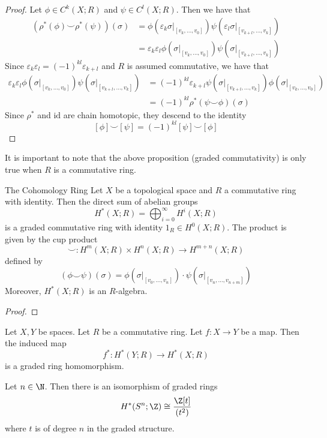 \documentclass[a4paper]{article}
\begin{document}
\begin{prp}{}{}
\begin{proof}
Let $\phi\in C^k(X;R)$ and $\psi\in C^l(X;R)$. Then we have that 
\begin{align*}
\left(\rho^\ast(\phi)\smile\rho^\ast(\psi)\right)(\sigma)&=\phi(\varepsilon_k\sigma|_{[v_k,\dots,v_0]})\psi(\varepsilon_l\sigma|_{[v_{k+l},\dots,v_k]})\\
&=\varepsilon_k\varepsilon_l\phi(\sigma|_{[v_k,\dots,v_0]})\psi(\sigma|_{[v_{k+l},\dots,v_k]})
\end{align*}
Since $\varepsilon_k\varepsilon_l=(-1)^{kl}\varepsilon_{k+l}$ and $R$ is assumed commutative, we have that
\begin{align*}
\varepsilon_k\varepsilon_l\phi(\sigma|_{[v_k,\dots,v_0]})\psi(\sigma|_{[v_{k+l},\dots,v_k]})&=(-1)^{kl}\varepsilon_{k+l}\psi(\sigma|_{[v_{k+l},\dots,v_k]})\phi(\sigma|_{[v_k,\dots,v_0]})\\
&=(-1)^{kl}\rho^\ast(\psi\smile\phi)(\sigma)
\end{align*}
Since $\rho^\ast$ and $\text{id}$ are chain homotopic, they descend to the identity $$[\phi]\smile[\psi]=(-1)^{kl}[\psi]\smile[\phi]$$
\end{proof}
\end{prp}

It is important to note that the above proposition (graded commutativity) is only true when $R$ is a commutative ring. 

\begin{thm}{The Cohomology Ring}{} Let $X$ be a topological space and $R$ a commutative ring with identity. Then the direct sum of abelian groups $$H^\ast(X;R)=\bigoplus_{i=0}^\infty H^i(X;R)$$ is a graded commutative ring with identity $1_R\in H^0(X;R)$. The product is given by the cup product $$\smile:H^m(X;R)\times H^n(X;R)\to H^{m+n}(X;R)$$ defined by $$(\phi\smile\psi)(\sigma)=\phi(\sigma|_{[v_0,\dots,v_n]})\cdot\psi(\sigma|_{[v_n,\dots,v_{n+m}]})$$ Moreover, $H^\ast(X;R)$ is an $R$-algebra. 
\begin{proof}
\end{proof}
\end{thm}

\begin{lmm}{}{} Let $X,Y$ be spaces. Let $R$ be a commutative ring. Let $f:X\to Y$ be a map. Then the induced map $$f^\ast:H^\ast(Y;R)\to H^\ast(X;R)$$ is a graded ring homomorphism. 
\end{lmm}

\begin{eg}{}{} Let $n\in\N$. Then there is an isomorphism of graded rings $$H^\ast(S^n;\Z)\cong\frac{\Z[t]}{(t^2)}$$ where $t$ is of degree $n$ in the graded structure. 
\end{eg}
\end{document}
